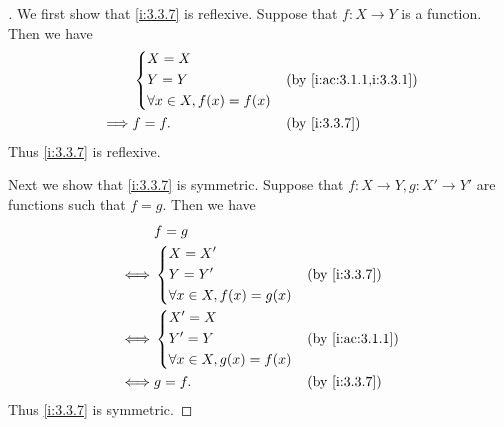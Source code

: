 \begin{proof}[]
  We first show that \cref{i:3.3.7} is reflexive.
  Suppose that \(f : X \to Y\) is a function.
  Then we have
  \begin{align*}
             & \begin{dcases}
                 X = X \\
                 Y = Y \\
                 \forall x \in X, f(x) = f(x)
               \end{dcases} &  & \by{i:ac:3.1.1,i:3.3.1}      \\
    \implies & f = f.                       &  & \by{i:3.3.7}
  \end{align*}
  Thus \cref{i:3.3.7} is reflexive.

  Next we show that \cref{i:3.3.7} is symmetric.
  Suppose that \(f : X \to Y, g : X' \to Y'\) are functions such that \(f = g\).
  Then we have
  \begin{align*}
         & f = g                                          \\
    \iff & \begin{dcases}
             X = X' \\
             Y = Y' \\
             \forall x \in X, f(x) = g(x)
           \end{dcases} &  & \by{i:3.3.7}                 \\
    \iff & \begin{dcases}
             X' = X \\
             Y' = Y \\
             \forall x \in X, g(x) = f(x)
           \end{dcases} &  & \by{i:ac:3.1.1}              \\
    \iff & g = f.                       &  & \by{i:3.3.7}
  \end{align*}
  Thus \cref{i:3.3.7} is symmetric.


\end{proof}
